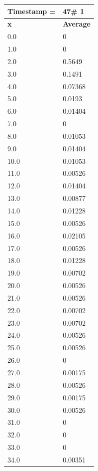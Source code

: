 \begin{tabular}{|l||l|}
\hline
\textbf{Timestamp =} & \textbf{47}\# 1\\\hline
	\textbf{x} & \textbf{Average} \\ \hline
\hline
	0.0 & 0 \\ \hline
	1.0 & 0 \\ \hline
	2.0 & 0.5649 \\ \hline
	3.0 & 0.1491 \\ \hline
	4.0 & 0.07368 \\ \hline
	5.0 & 0.0193 \\ \hline
	6.0 & 0.01404 \\ \hline
	7.0 & 0 \\ \hline
	8.0 & 0.01053 \\ \hline
	9.0 & 0.01404 \\ \hline
	10.0 & 0.01053 \\ \hline
	11.0 & 0.00526 \\ \hline
	12.0 & 0.01404 \\ \hline
	13.0 & 0.00877 \\ \hline
	14.0 & 0.01228 \\ \hline
	15.0 & 0.00526 \\ \hline
	16.0 & 0.02105 \\ \hline
	17.0 & 0.00526 \\ \hline
	18.0 & 0.01228 \\ \hline
	19.0 & 0.00702 \\ \hline
	20.0 & 0.00526 \\ \hline
	21.0 & 0.00526 \\ \hline
	22.0 & 0.00702 \\ \hline
	23.0 & 0.00702 \\ \hline
	24.0 & 0.00526 \\ \hline
	25.0 & 0.00526 \\ \hline
	26.0 & 0 \\ \hline
	27.0 & 0.00175 \\ \hline
	28.0 & 0.00526 \\ \hline
	29.0 & 0.00175 \\ \hline
	30.0 & 0.00526 \\ \hline
	31.0 & 0 \\ \hline
	32.0 & 0 \\ \hline
	33.0 & 0 \\ \hline
	34.0 & 0.00351 \\ \hline
\end{tabular}

